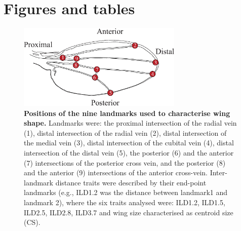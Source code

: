 \onehalfspacing
\newpage
\vspace{-1.5cm}
\section{Figures and tables}
\begin{figure}[hbp]
\centering
\includegraphics[width=0.7\textwidth]{Chp3_Multi/WingNineLM.eps}
\caption[Positions of the nine landmarks used to characterise wing shape.]{\textbf{Positions of the nine landmarks used to characterise wing shape.} Landmarks were: the proximal intersection of the radial vein (1), distal intersection of the radial vein (2), distal intersection of the medial vein (3), distal intersection of the cubital vein (4), distal intersection of the distal vein (5), the posterior (6) and the anterior (7) intersections of the posterior cross vein, and the posterior (8) and the anterior (9) intersections of the anterior cross-vein. Inter-landmark distance traits were described by their end-point landmarks (e.g., ILD1.2 was the distance between landmark1 and landmark 2), where the six traits analysed were: ILD1.2, ILD1.5, ILD2.5, ILD2.8, ILD3.7 and wing size characterised as centroid size (CS).} 
\label{fig:multi_WingNineLM}
\end{figure}
\newpage

